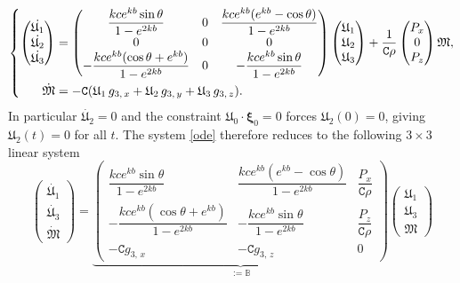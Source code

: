 \documentclass[reqno]{amsart}
\newcommand{\cs}{\texttt{C}}
\newcommand{\A}{\boldsymbol{\mathfrak{U}}}              %
\newcommand{\B}{{\mathfrak{M}}}
\begin{document}
\begin{equation} \label{ode}
    \left\{\begin{aligned}
        \begin{pmatrix}
            \dot{\mathfrak{U}_1}\\
            \dot{\mathfrak{U}_2}\\
            \dot{\mathfrak{U}_3}
        \end{pmatrix}&=\begin{pmatrix}
	 \dfrac{kce^{kb}\sin\theta}{1-e^{2kb}} & 0& \dfrac{kce^{kb}(e^{kb}-\cos\theta)}{1-e^{2kb}}\\
     0 &0&0\\
    -\dfrac{kc e^{kb}(\cos\theta + e^{kb})}{1-e^{2kb}}& 0 & -\dfrac{kc e^{kb}\sin\theta}{1-e^{2kb}}
\end{pmatrix}\begin{pmatrix}
            {\mathfrak{U}_1}\\
            {\mathfrak{U}_2}\\
            {\mathfrak{U}_3}
        \end{pmatrix}       +\dfrac{1}{\cs\rho}\begin{pmatrix}
           P_x\\
            0\\
            P_z
        \end{pmatrix}\B, \\ \vspace{.5cm}
        \dot{\B}&=-\cs({\mathfrak{U}_1}\, g_{3,\,x}+{\mathfrak{U}_2}\, g_{3,\,y}+{\mathfrak{U}_3}\, g_{3,\,z}).
    \end{aligned}\right.
\end{equation}
In particular $\dot{\mathfrak{U}_2}=0$ and the constraint \(    \A_0\cdot \boldsymbol{\xi}_0=0\) forces $\mathfrak{U}_2(0)=0$, giving $\mathfrak{U}_2(t)=0$ for all $t$. The system \eqref{ode} therefore reduces to the following $3\times3$ linear system 
\begin{equation}\label{3ode}
\begin{pmatrix}
            \dot{\mathfrak{U}_1}\\
            \dot{\mathfrak{U}_3}\\
            \dot{\mathfrak{M}}
        \end{pmatrix}
=\underbrace{
\begin{pmatrix}
\dfrac{kce^{kb}\sin\theta}{1-e^{2kb}}
&
\dfrac{kce^{kb}(e^{kb}-\cos\theta)}{1-e^{2kb}}
&
\dfrac{P_x}{\cs\rho}
\\[1.2em]
-\dfrac{kc e^{kb}(\cos\theta+e^{kb})}{1-e^{2kb}}
&
-\dfrac{kce^{kb}\sin\theta}{1-e^{2kb}}
&
\dfrac{P_z}{\cs\rho}
\\[1.2em]
-\cs g_{3,\,x}
&
-\cs g_{3,\,z}
&
0
\end{pmatrix}}_{:=\mathbb{B}}\begin{pmatrix}
            {\mathfrak{U}_1}\\
            {\mathfrak{U}_3}\\
            {\mathfrak{M}}
        \end{pmatrix}
\end{equation}
\end{document}
